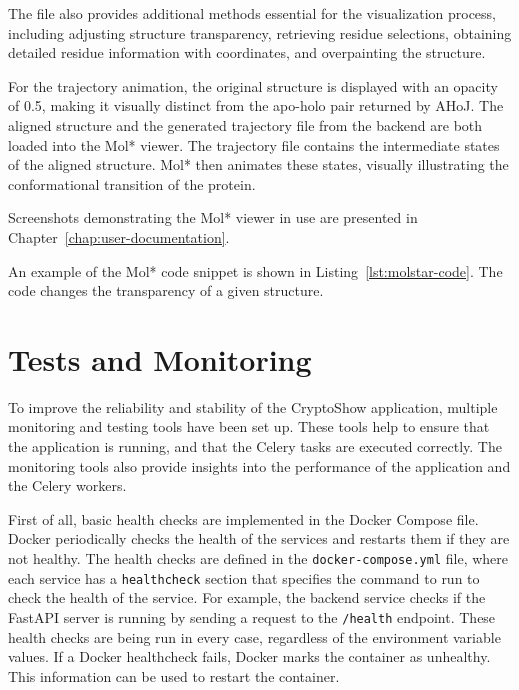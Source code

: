 The file also provides additional methods essential for the visualization process, including adjusting structure transparency, retrieving residue selections, obtaining detailed residue information with coordinates, and overpainting the structure.

For the trajectory animation, the original structure is displayed with an opacity of 0.5, making it visually distinct from the apo-holo pair returned by AHoJ. The aligned structure and the generated trajectory file from the backend are both loaded into the Mol* viewer. The trajectory file contains the intermediate states of the aligned structure. Mol* then animates these states, visually illustrating the conformational transition of the protein.

Screenshots demonstrating the Mol* viewer in use are presented in Chapter~\ref{chap:user-documentation}.

An example of the Mol* code snippet is shown in Listing~\ref{lst:molstar-code}. The code changes the transparency of a given structure.



\section{Tests and Monitoring}
\label{sec:tests-monitoring}

To improve the reliability and stability of the CryptoShow application, multiple monitoring and testing tools have been set up. These tools help to ensure that the application is running, and that the Celery tasks are executed correctly. The monitoring tools also provide insights into the performance of the application and the Celery workers.

First of all, basic health checks are implemented in the Docker Compose file. Docker periodically checks the health of the services and restarts them if they are not healthy. The health checks are defined in the \lstinline!docker-compose.yml! file, where each service has a \lstinline|healthcheck| section that specifies the command to run to check the health of the service. For example, the backend service checks if the FastAPI server is running by sending a request to the \lstinline!/health! endpoint. These health checks are being run in every case, regardless of the environment variable values. If a Docker healthcheck fails, Docker marks the container as unhealthy. This information can be used to restart the container.

